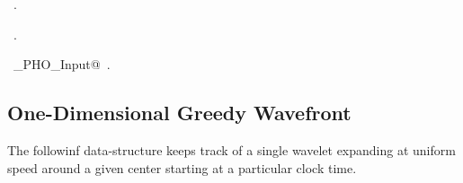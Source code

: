 \documentclass[12.0pt]{report}
\begin{document}
\begin{flushleft}
\begin{list}{}{}
\mbox{}\verb@@{\NWsep}
\end{list}
\vspace{-1.5ex}
\footnotesize
\begin{list}{}{\setlength{\itemsep}{-\parsep}\setlength{\itemindent}{-\leftmargin}}
\item \NWtxtMacroDefBy\ .
\item \NWtxtMacroRefIn\ .
\item \NWtxtIdentsDefed\nobreak\  \verb@Single_PHO_Input@\nobreak\ .
\item{}
\end{list}
\vspace{4ex}
\end{flushleft}

\subsection{One-Dimensional Greedy Wavefront} \hspace{10mm}

The followinf data-structure keeps track of a single wavelet expanding at uniform speed around a given center
starting at a particular clock time. 
\end{document}
